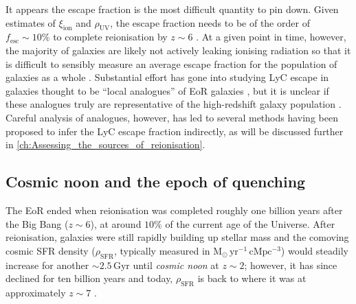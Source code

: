 It appears the escape fraction is the most difficult quantity to pin down. Given estimates of $\xi_\text{ion}$ and $\rho_\text{UV}$, the escape fraction needs to be of the order of $f_\text{esc} \sim 10\%$ to complete reionisation by $z \sim 6$ \citep[e.g.][]{2015ApJ...802L..19R, 2018MNRAS.479..994R, 2020MNRAS.498..164K}. At a given point in time, however, the majority of galaxies are likely not actively leaking ionising radiation so that it is difficult to sensibly measure an average escape fraction for the population of galaxies as a whole \citep[e.g.][]{2022MNRAS.512.5960M}. Substantial effort has gone into studying LyC escape in galaxies thought to be ``local analogues'' of EoR galaxies \citep[e.g.][]{2016ApJ...827..126B, 2019ApJ...874...93B, 2017MNRAS.472.2608S, 2019MNRAS.488.3492S, 2021MNRAS.503.6112S, 2016MNRAS.461.3683I, 2016Natur.529..178I, 2018MNRAS.474.4514I, 2018MNRAS.478.4851I, 2021MNRAS.503.1734I, 2018ApJ...855...96H, 2019ApJ...885...57W, 2021ApJ...916....3W}, but it is unclear if these analogues truly are representative of the high-redshift galaxy population \citep[e.g.][]{2022arXiv220713693K}. Careful analysis of analogues, however, has led to several methods having been proposed to infer the LyC escape fraction indirectly, as will be discussed further in \cref{ch:Assessing_the_sources_of_reionisation}.

\subsection{Cosmic noon and the epoch of quenching}
\label{chIssec:Cosmic_noon_and_the_epoch_of_quenching}

The EoR ended when reionisation was completed roughly one billion years after the Big Bang ($z \sim 6$), at around $10\%$ of the current age of the Universe. After reionisation, galaxies were still rapidly building up stellar mass and the comoving cosmic SFR density ($\rho_\text{SFR}$, typically measured in $\mathrm{M_\odot \, yr^{-1} \, cMpc^{-3}}$) would steadily increase for another $\sim 2.5 \, \mathrm{Gyr}$ until \textit{cosmic noon} at $z \sim 2$; however, it has since declined for ten billion years and today, $\rho_\text{SFR}$ is back to where it was at approximately $z \sim 7$ \citep{2014ARA&A..52..415M}.

